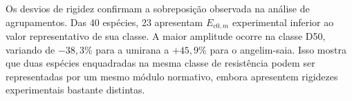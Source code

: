 

Os desvios de rigidez confirmam a sobreposição observada na análise de agrupamentos. Das 40 espécies, 23 apresentam $E_{c0,m}$ experimental inferior ao valor representativo de sua classe. A maior amplitude ocorre na classe D50, variando de $-38{,}3\%$ para a umirana a $+45{,}9\%$ para o angelim-saia. Isso mostra que duas espécies enquadradas na mesma classe de resistência podem ser representadas por um mesmo módulo normativo, embora apresentem rigidezes experimentais bastante distintas.

